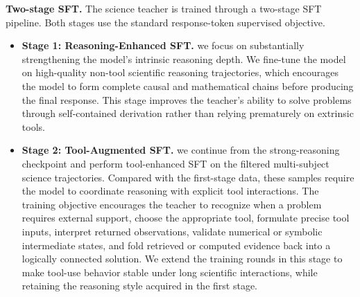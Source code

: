 \documentclass{llmxive}
\begin{document}
\textbf{Two-stage SFT.} The science teacher is trained through a two-stage SFT pipeline. Both stages use the standard response-token supervised objective.
\begin{itemize}
    \item \textbf{Stage 1: Reasoning-Enhanced SFT.} 
     we focus on substantially strengthening the model's intrinsic reasoning depth. We fine-tune the model on high-quality non-tool scientific reasoning trajectories, which encourages the model to form complete causal and mathematical chains before producing the final response. This stage improves the teacher's ability to solve problems through self-contained derivation rather than relying prematurely on extrinsic tools.

    \item \textbf{Stage 2: Tool-Augmented SFT.}
    we continue from the strong-reasoning checkpoint and perform tool-enhanced SFT on the filtered multi-subject science trajectories. Compared with the first-stage data, these samples require the model to coordinate reasoning with explicit tool interactions. The training objective encourages the teacher to recognize when a problem requires external support, choose the appropriate tool, formulate precise tool inputs, interpret returned observations, validate numerical or symbolic intermediate states, and fold retrieved or computed evidence back into a logically connected solution. We extend the training rounds in this stage to make tool-use behavior stable under long scientific interactions, while retaining the reasoning style acquired in the first stage.
\end{itemize}


\end{document}
